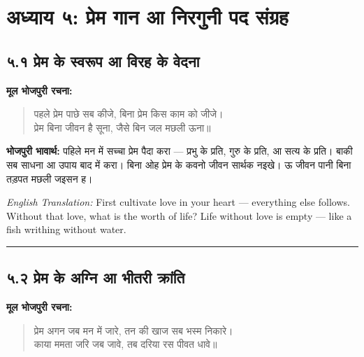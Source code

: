 
\cleardoublepage
\section*{अध्याय ५: प्रेम गान आ निरगुनी पद संग्रह}

\subsection*{५.१ प्रेम के स्वरूप आ विरह के वेदना}

\textbf{मूल भोजपुरी रचना:}

\begin{quote}
पहले प्रेम पाछे सब कीजे, बिना प्रेम किस काम को जीजे।\\
प्रेम बिना जीवन है सूना, जैसे बिन जल मछली ऊना॥
\end{quote}

\textbf{भोजपुरी भावार्थ:} पहिले मन में सच्चा प्रेम पैदा करा --- प्रभु के प्रति, गुरु के प्रति, आ सत्य के प्रति। बाकी सब साधना आ उपाय बाद में करा। बिना ओह प्रेम के कवनो जीवन सार्थक नइखे। ऊ जीवन पानी बिना तड़पत मछली जइसन ह।

\begin{sloppypar}
{\engfont \textit{English Translation:} First cultivate love in your heart --- everything else follows.
Without that love, what is the worth of life? Life without love is empty --- like a fish writhing without water.}
\end{sloppypar}

\begin{center}
{\color{bordercolor}\rule{0.4\textwidth}{0.4pt}}
\end{center}

\subsection*{५.२ प्रेम के अग्नि आ भीतरी क्रांति}

\textbf{मूल भोजपुरी रचना:}

\begin{quote}
प्रेम अगन जब मन में जारे, तन की खाज सब भस्म निकारे।\\
काया ममता जरि जब जावे, तब दरिया रस पीवत धावे॥
\end{quote}


